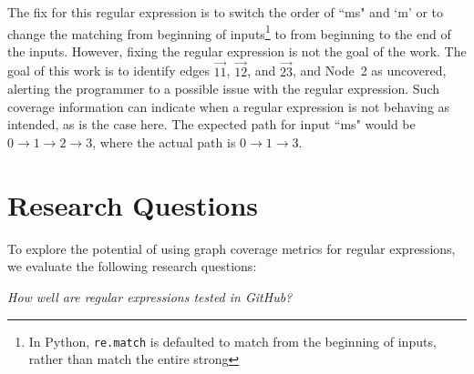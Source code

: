 The fix for this regular expression is to switch the order of ``ms" and `m' or to change the matching from beginning of inputs\footnote{In Python, {\tt re.match} is defaulted to match from the beginning of inputs, rather than match the entire strong} to from beginning to the end of the inputs. However, fixing the regular expression is not the goal of the work. The goal of this work is to identify edges $\overrightarrow{11}$, $\overrightarrow{12}$, and $\overrightarrow{23}$, and Node~2 as uncovered, alerting the programmer to a possible issue with the regular expression. Such coverage information can indicate when a regular expression is not behaving as intended, as is the case here. The expected path for input ``ms" would be $0 \rightarrow 1 \rightarrow 2 \rightarrow 3$, where the actual path is $0 \rightarrow 1 \rightarrow  3$.

\fi








\section{Research Questions}
\label{sec:rq}
To explore the potential of using graph coverage metrics  for regular expressions, we evaluate the following research questions: 
%
%

 {\em How well are regular expressions tested in GitHub?}

